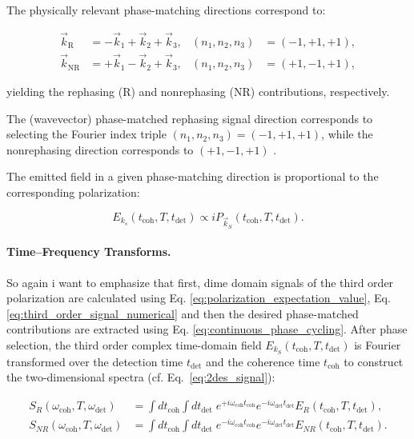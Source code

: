 \noindent 
The physically relevant phase-matching directions correspond to:

\begin{align}
	\vec{k}_{\mathrm{R}}  & = -\vec{k}_1 + \vec{k}_2 + \vec{k}_3,
	                      & (n_1,n_2,n_3)                         & = (-1,+1,+1), \label{eq:rephasing_selection}    \\
	\vec{k}_{\mathrm{NR}} & = +\vec{k}_1 - \vec{k}_2 + \vec{k}_3,
	                      & (n_1,n_2,n_3)                         & = (+1,-1,+1), \label{eq:nonrephasing_selection}
\end{align}

\noindent 
yielding the rephasing (R) and nonrephasing (NR) contributions, respectively.

\noindent 
The (wavevector) phase-matched rephasing signal direction corresponds to selecting the Fourier index triple $(n_1,n_2,n_3)=(-1,+1,+1)$, while the nonrephasing direction corresponds to $(+1,-1,+1)$ \cite{mukamel1995principlesnonlinearoptical, cho2009twodimensionalopticalspectroscopy, greenetal2024vibrationalcoherenceshalfbroadband}.

\noindent 
The emitted field in a given phase-matching direction is proportional to the corresponding polarization:

\begin{equation}
	E_{k_s}(t_{\text{coh}},T,t_{\text{det}}) \propto i P_{\vec{k}_S}(t_{\text{coh}},T,t_{\text{det}}).
	\label{eq:field_polarization_relation}
\end{equation}


\paragraph{Time--Frequency Transforms.}

\noindent 
So again i want to emphasize that first, dime domain signals of the third order polarization are calculated using Eq. \eqref{eq:polarization_expectation_value}, Eq. \eqref{eq:third_order_signal_numerical} and then the desired phase-matched contributions are extracted using Eq. \eqref{eq:continuous_phase_cycling}. 
After phase selection, the third order complex time-domain field $E_{k_S}(t_{\text{coh}}, T, t_{\text{det}})$ is Fourier transformed over the detection time $t_{\text{det}}$ and the coherence time $t_{\text{coh}}$ to construct the two-dimensional spectra (cf. Eq.~\eqref{eq:2des_signal}):

\begin{align}
	S_{R}(\omega_{\text{coh}}, T, \omega_{\text{det}})
	 & =
	\int dt_{\text{coh}} \int dt_{\text{det}} \;
	e^{+ i \omega_{\text{coh}} t_{\text{coh}}} e^{- i \omega_{\text{det}} t_{\text{det}}}
	E_{R}(t_{\text{coh}}, T, t_{\text{det}}),
	\label{eq:rephasing_transform} \\
	S_{NR}(\omega_{\text{coh}}, T, \omega_{\text{det}})
	 & =
	\int dt_{\text{coh}} \int dt_{\text{det}} \;
	e^{- i \omega_{\text{coh}} t_{\text{coh}}} e^{- i \omega_{\text{det}} t_{\text{det}}}
	E_{NR}(t_{\text{coh}}, T, t_{\text{det}}).
	\label{eq:nonrephasing_transform}
\end{align}

